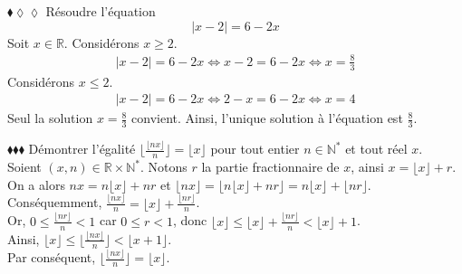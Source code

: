 \documentclass[11pt]{article}
\begin{document}
\vspace*{-0.8cm}

\begin{exercice}{$\blacklozenge\lozenge\lozenge$}{}
    Résoudre l'équation
    \begin{equation*}
        |x-2|=6-2x
    \end{equation*}
    \tcblower
    Soit $x\in\mathbb{R}$. Considérons $x\geq2$.
    \begin{align*}
        |x-2|=6-2x\iff x-2=6-2x\iff x=\frac{8}{3}
    \end{align*}
    Considérons $x\leq2$.
    \begin{align*}
        |x-2|=6-2x\iff 2-x=6-2x\iff x=4
    \end{align*}
    Seul la solution $x=\frac{8}{3}$ convient. Ainsi, l'unique solution à l'équation est $\frac{8}{3}$.
\end{exercice}

\begin{exercice}{$\blacklozenge\blacklozenge\blacklozenge$}{}
    Démontrer l'égalité $\lfloor\frac{\lfloor{nx}\rfloor}{n}\rfloor=\lfloor{x}\rfloor$ pour tout entier $n\in\mathbb{N}^*$ et tout réel $x$.\\
    Soient $(x,n)\in\mathbb{R}\times\mathbb{N}^*$.
    \tcblower
    Notons $r$ la partie fractionnaire de $x$, ainsi $x=\lfloor{x}\rfloor+r$.\\
    On a alors $nx=n\lfloor{x}\rfloor+nr$ et $\lfloor{nx}\rfloor=\lfloor{n\lfloor{x}\rfloor+nr}\rfloor=n\lfloor{x}\rfloor+\lfloor{nr}\rfloor$.\\
    Conséquemment, $\frac{\lfloor{nx}\rfloor}{n}=\lfloor{x}\rfloor+\frac{\lfloor{nr}\rfloor}{n}$.\\
    Or, $0\leq\frac{\lfloor{nr}\rfloor}{n}<1$ car $0\leq r<1$, donc $\lfloor{x}\rfloor\leq\lfloor{x}\rfloor+\frac{\lfloor{nr}\rfloor}{n}<\lfloor{x}\rfloor+1$.\\
    Ainsi, $\lfloor{x}\rfloor\leq\lfloor\frac{\lfloor{nx}\rfloor}{n}\rfloor<\lfloor{x}+1\rfloor$.\\
    Par conséquent, $\lfloor\frac{\lfloor{nx}\rfloor}{n}\rfloor = \lfloor{x}\rfloor$.
\end{exercice}
\end{document}
